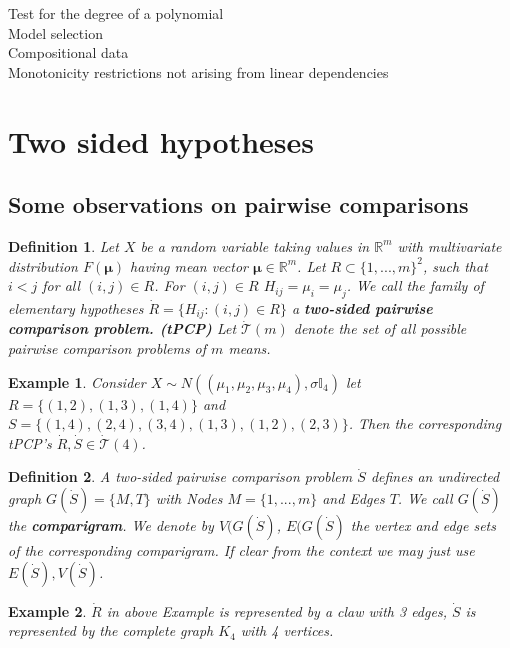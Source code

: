 \documentclass[a4paper,12pt]{article}
\newtheorem{definition}{Definition}
\newtheorem{bsp}{Example}
\newcommand{\bs}[1]{\boldsymbol{#1}}
\begin{document}
\begin{description}
\item[Test for the degree of a polynomial]
\item[Model selection]
\item[Compositional data]
\item[Monotonicity restrictions not arising from linear dependencies]
\end{description}

\section{Two sided hypotheses}

\subsection{Some observations on pairwise comparisons}

\begin{definition}
  Let $X$ be a random variable taking values in $\mathbb{R}^m$ with
  multivariate distribution $F(\bs{\mu})$ having mean vector $\bs{\mu}
  \in \mathbb{R}^m$. Let $R \subset \{1,...,m\}^2$, such that $i <
  j$ for all $(i,j) \in R$. For $(i,j) \in R$ $H_{ij} = \mu_i =
  \mu_j$. We call the family of elementary hypotheses $\dot{R}
  = \{H_{ij}: (i,j) \in R\}$ a {\bf two-sided pairwise comparison
    problem. (tPCP)} Let $\dot{\mathcal{T}}(m)$ denote the set of all
  possible pairwise comparison problems of $m$ means.
\end{definition}

\begin{bsp}
  Consider $X \sim N((\mu_1,\mu_2,\mu_3,\mu_4),\sigma \mathbb{I}_4)$
  let $R = \{(1,2),(1,3),(1,4)\}$ and $S =
  \{(1,4),(2,4),(3,4),(1,3),(1,2),(2,3)\}$. Then the
  corresponding tPCP's $\dot{R},\dot{S} \in \dot{\mathcal{T}}(4)$.
\end{bsp}

\begin{definition}
  A two-sided pairwise comparison problem $\dot{S}$ defines an
  undirected graph $G(\dot{S}) = \{M,T\}$ with Nodes $M = \{1,...,m\}$
  and Edges $T$. We call $G(\dot{S})$ the {\bf comparigram}. We denote
  by $V(G(\dot{S})$, $E(G(\dot{S})$ the vertex and edge sets of the
  corresponding comparigram. If clear from the context we may just use
  $E(\dot{S}),V(\dot{S})$. 
\end{definition}

\begin{bsp}
  $\dot{R}$ in above Example is represented by a claw with 3 edges,
  $\dot{S}$ is represented by the complete graph $K_4$ with 4 vertices.
\end{bsp}
\end{document}
